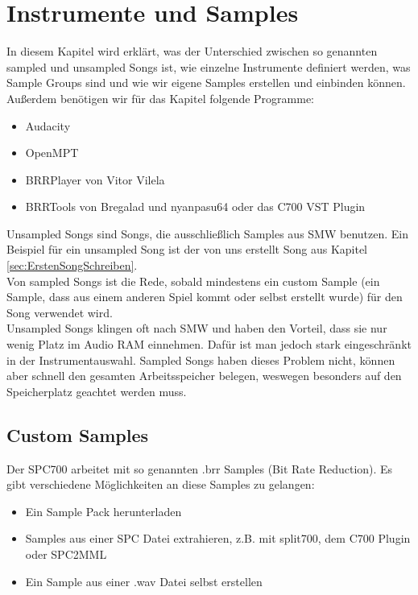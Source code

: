 
\section{Instrumente und Samples}
\label{sec:instrumente}

In diesem Kapitel wird erklärt, was der Unterschied zwischen so genannten sampled und unsampled Songs ist, wie einzelne Instrumente definiert werden, was Sample Groups sind und wie wir eigene Samples erstellen und einbinden können. \\
Außerdem benötigen wir für das Kapitel folgende Programme:

\medskip

\begin{itemize}
	\item Audacity
	\item OpenMPT
	\item BRRPlayer von Vitor Vilela
	\item BRRTools von Bregalad und nyanpasu64 oder das C700 VST Plugin
\end{itemize}

\medskip


Unsampled Songs sind Songs, die ausschließlich Samples aus SMW benutzen. Ein Beispiel für ein unsampled Song ist der von uns erstellt Song aus Kapitel \ref{sec:ErstenSongSchreiben}. \\
Von sampled Songs ist die Rede, sobald mindestens ein custom Sample (ein Sample, dass aus einem anderen Spiel kommt oder selbst erstellt wurde) für den Song verwendet wird. \\
Unsampled Songs klingen oft nach SMW und haben den Vorteil, dass sie nur wenig Platz im Audio RAM einnehmen. Dafür ist man jedoch stark eingeschränkt in der Instrumentauswahl. Sampled Songs haben dieses Problem nicht, können aber schnell den gesamten Arbeitsspeicher belegen, weswegen besonders auf den Speicherplatz geachtet werden muss.

\subsection{Custom Samples}

Der SPC700 arbeitet mit so genannten .brr Samples (Bit Rate Reduction). Es gibt verschiedene Möglichkeiten an diese Samples zu gelangen:

\medskip

\begin{itemize}
	\item Ein Sample Pack herunterladen
	\item Samples aus einer SPC Datei extrahieren, z.B. mit split700, dem C700 Plugin oder SPC2MML
	\item Ein Sample aus einer .wav Datei selbst erstellen 
\end{itemize}

